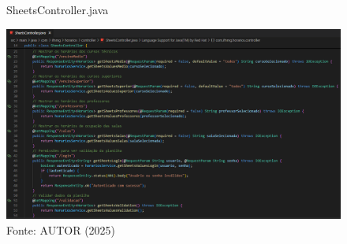 \begin{itemize}
    \begin{figure}[H]
        \centering
        \caption{SheetsController.java}
        \includegraphics[width=1\textwidth]{Figuras/back-3.png}
        \caption*{Fonte: AUTOR (2025)}
        \label{fig_back_3}
    \end{figure}


\end{itemize}
